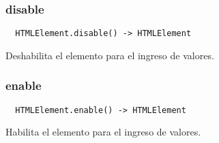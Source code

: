 \subsubsection*{disable}
\begin{verbatim}
  HTMLElement.disable() -> HTMLElement
\end{verbatim}
Deshabilita el elemento para el ingreso de valores.

\subsubsection*{enable}
\begin{verbatim}
  HTMLElement.enable() -> HTMLElement
\end{verbatim}
Habilita el elemento para el ingreso de valores.
